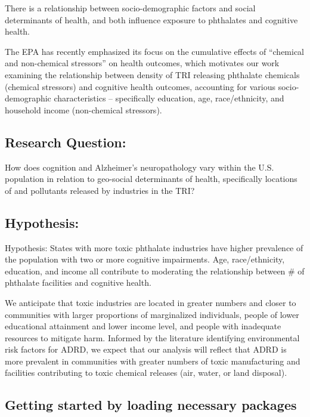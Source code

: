 \documentclass[
]{article}
\begin{document}
There is a relationship between socio-demographic factors and social
determinants of health, and both influence exposure to phthalates and
cognitive health.

The EPA has recently emphasized its focus on the cumulative effects of
``chemical and non-chemical stressors'' on health outcomes, which
motivates our work examining the relationship between density of TRI
releasing phthalate chemicals (chemical stressors) and cognitive health
outcomes, accounting for various socio-demographic characteristics --
specifically education, age, race/ethnicity, and household income
(non-chemical stressors).

\hypertarget{research-question}{%
\subsection{Research Question:}\label{research-question}}

How does cognition and Alzheimer's neuropathology vary within the U.S.
population in relation to geo-social determinants of health,
specifically locations of and pollutants released by industries in the
TRI?

\hypertarget{hypothesis}{%
\subsection{Hypothesis:}\label{hypothesis}}

Hypothesis: States with more toxic phthalate industries have higher
prevalence of the population with two or more cognitive impairments.
Age, race/ethnicity, education, and income all contribute to moderating
the relationship between \# of phthalate facilities and cognitive
health.

We anticipate that toxic industries are located in greater numbers and
closer to communities with larger proportions of marginalized
individuals, people of lower educational attainment and lower income
level, and people with inadequate resources to mitigate harm. Informed
by the literature identifying environmental risk factors for ADRD, we
expect that our analysis will reflect that ADRD is more prevalent in
communities with greater numbers of toxic manufacturing and facilities
contributing to toxic chemical releases (air, water, or land disposal).

\hypertarget{getting-started-by-loading-necessary-packages}{%
\subsection{Getting started by loading necessary
packages}\label{getting-started-by-loading-necessary-packages}}
\end{document}
